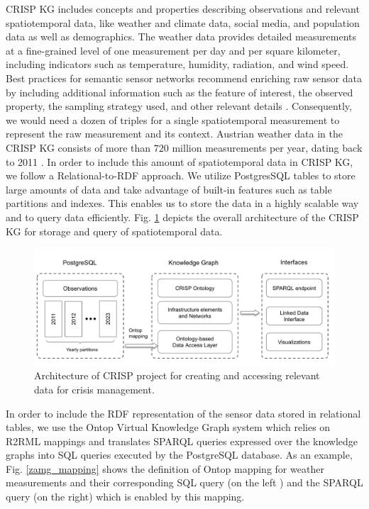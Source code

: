 \documentclass[
]{ceurart}
\begin{document}
CRISP KG includes concepts and properties describing observations and relevant spatiotemporal data, like weather and climate data, social media, and population data as well as demographics. The weather data provides detailed measurements at a fine-grained level of one measurement per day and per square kilometer, including indicators such as temperature, humidity, radiation, and wind speed. Best practices for semantic sensor networks recommend enriching raw sensor data by including additional information such as the feature of interest, the observed property, the sampling strategy used, and other relevant details \cite{janowicz2019sosa}. Consequently, we would need a dozen of triples for a single spatiotemporal measurement to represent the raw measurement and its context. Austrian weather data in the CRISP KG consists of more than $720$ million measurements per year,  dating back to 2011 \cite{haiden2011integrated}. In order to include this amount of spatiotemporal data in CRISP KG, we follow a Relational-to-RDF approach. We utilize PostgresSQL tables to store large amounts of data and take advantage of built-in features such as table partitions and indexes. This enables us to store the data in a highly scalable way and to query data efficiently. Fig. \ref{crisp_architecture} depicts the overall architecture of the CRISP KG for storage and query of spatiotemporal data.  


\begin{figure}
  \centering
  \includegraphics[width=\linewidth]{images/CRISP_architecture.png}
  \caption{Architecture of CRISP project for creating and accessing relevant data for crisis management.}
  \label{crisp_architecture}
\end{figure}


In order to include the RDF representation of the sensor data stored in relational tables, we use the Ontop Virtual Knowledge Graph system \cite{xiao2020virtual} which relies on R2RML mappings and translates SPARQL queries expressed over the knowledge graphs into SQL queries executed by the PostgreSQL database. As an example, Fig. \ref{zamg_mapping} shows the definition of Ontop mapping for weather measurements and their corresponding SQL query (on the left ) and the SPARQL query (on the right) which is enabled by this mapping.  
\end{document}
